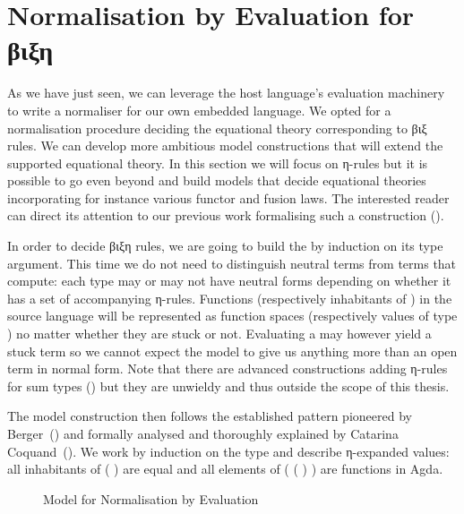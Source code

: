 \section{Normalisation by Evaluation for βιξη}
\label{normbye}

As we have just seen, we can leverage the host language's evaluation
machinery to write a normaliser for our own embedded language. We opted
for a normalisation procedure deciding the equational theory corresponding
to βιξ rules. We can develop more ambitious model constructions that will
extend the supported equational theory.
%
In this section we will focus on η-rules but it is possible to go even
beyond and build models that decide equational theories incorporating
for instance various functor and fusion laws. The interested reader can
direct its attention to our previous work formalising such a construction
(\citeyear{DBLP:conf/icfp/AllaisMB13}).

In order to decide βιξη rules, we are going to build the  by
induction on its type argument. This time we do not need to distinguish
neutral terms from terms that compute: each type may or may not have
neutral forms depending on whether it has a set of accompanying η-rules.
%
Functions (respectively inhabitants of ) in the source language
will be represented as function spaces (respectively values of type )
no matter whether they are stuck or not. Evaluating a  may however
yield a stuck term so we cannot expect the model to give us anything more than
an open term in normal form. Note that there are advanced constructions
adding η-rules for sum types
(\cite{DBLP:conf/tlca/Ghani95,DBLP:conf/flops/AltenkirchU04,DBLP:conf/tlca/Lindley07})
but they are unwieldy and thus outside the scope of this thesis.


The model construction then follows the established pattern pioneered by
Berger~(\citeyear{berger1993program}) and formally analysed and thoroughly
explained by Catarina Coquand~(\citeyear{coquand2002formalised}). We work
by induction on the type and describe η-expanded values: all inhabitants
of (  ) are equal and all elements
of ( (  ) ) are functions in Agda.

\begin{figure}[h]
\caption{Model for Normalisation by Evaluation\label{fig:nbemodel}}
\end{figure}

